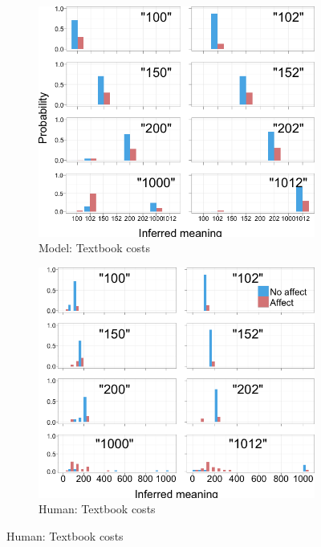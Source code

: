 \documentclass{article} %
\begin{document}
\begin{figure}[t]
        \begin{subfigure}[b]{0.51\textwidth}
                \centering
                \caption{Model: Textbook costs}
                \includegraphics[width=\textwidth]{model_textbook_all.png}
	\end{subfigure}
        \begin{subfigure}[b]{0.51\textwidth}
                \centering
                \caption{Human: Textbook costs}
                \includegraphics[width=\textwidth]{humans_textbook_all.png}
	\end{subfigure}
	\qquad
	

\end{figure}
\end{document}
